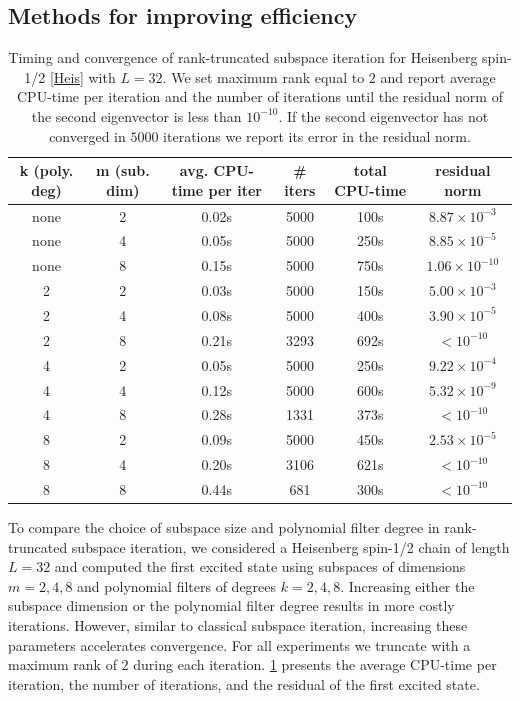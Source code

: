 \documentclass[10pt,preprint]{elsarticle}
\begin{document}
\subsection{Methods for improving efficiency} 
\label{sec:improving_eff}

\begin{table}[tbhp]
\footnotesize
\caption{Timing and convergence of rank-truncated subspace iteration for Heisenberg spin-1/2 \eqref{Heis} with $L=32$. We set maximum rank equal to $2$ and report average CPU-time per iteration and the number of iterations until the residual norm of the second eigenvector is less than $10^{-10}$. If the second eigenvector has not converged in $5000$ iterations we report its error in the residual norm.} 
\label{table:timings_heis}
\begin{center}
\begin{tabular}{ c | c | c | c | c | c}
k (poly. deg) & m (sub. dim) & avg. CPU-time per iter & \# iters & total CPU-time & residual norm \\ 
\hline 
none & 2 & 0.02s & 5000 & 100s & $8.87 \times 10^{-3}$ \\
none & 4 & 0.05s & 5000 & 250s & $8.85 \times 10^{-5}$ \\
none & 8 & 0.15s & 5000 & 750s & $1.06 \times 10^{-10}$ \\
%
2 & 2 & 0.03s & 5000 & 150s & $5.00 \times 10^{-3}$ \\
2 & 4 & 0.08s & 5000 & 400s & $3.90 \times 10^{-5}$ \\ 
2 & 8 & 0.21s & 3293 & 692s & $<10^{-10}$ \\
%
4 & 2 & 0.05s & 5000 & 250s & $9.22 \times 10^{-4}$ \\
4 & 4 & 0.12s & 5000 & 600s & $5.32 \times 10^{-9}$ \\ 
4 & 8 & 0.28s & 1331 & 373s & $<10^{-10}$ \\
%
8 & 2 & 0.09s & 5000 & 450s & $2.53 \times 10^{-5}$ \\
8 & 4 & 0.20s & 3106 & 621s & $<10^{-10}$ \\ 
8 & 8 & 0.44s & 681 & 300s & $<10^{-10}$ \\
\end{tabular}
\end{center}
\end{table}

To compare the choice of subspace size and polynomial filter degree in rank-truncated subspace iteration, we considered a Heisenberg spin-1/2 chain of length $L=32$ and computed the first excited state using subspaces of dimensions $m=2,4,8$ and polynomial filters of degrees $k=2,4,8$. Increasing either the subspace dimension or the polynomial filter degree results in more costly iterations. However, similar to classical subspace iteration, increasing these parameters accelerates convergence. For all experiments we truncate with a maximum rank of $2$ during each iteration. \cref{table:timings_heis} presents the average CPU-time per iteration, the number of iterations, and the residual of the first excited state. 
\end{document}
